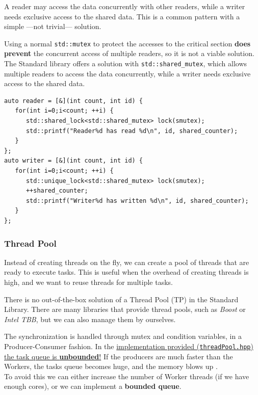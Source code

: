 A reader may access the data concurrently with
other readers, while a writer needs exclusive access to the shared data.
This is a common pattern with a simple  ---not trivial--- solution.

\begin{paracol}{2}
   
   \colfill
   Using a normal \lstinline|std::mutex| to protect the accesses to the critical section \textbf{does prevent} the concurrent access of multiple readers, so it is not a viable solution.
   The Standard library offers a solution with \lstinline|std::shared_mutex|, which allows multiple readers to access the data concurrently, while a writer needs exclusive access to the shared data.
   \colfill
   
   \switchcolumn   
   
   \begin{lstlisting}[caption={spm3/reader-writer.cpp}]
auto reader = [&](int count, int id) {
   for(int i=0;i<count; ++i) {
      std::shared_lock<std::shared_mutex> lock(smutex);
      std::printf("Reader%d has read %d\n", id, shared_counter);
   }
};
auto writer = [&](int count, int id) {
   for(int i=0;i<count; ++i) {
      std::unique_lock<std::shared_mutex> lock(smutex);
      ++shared_counter;
      std::printf("Writer%d has written %d\n", id, shared_counter);
   }
};  
\end{lstlisting}
               
\end{paracol}

\subsubsection{Thread Pool}
Instead of creating threads on the fly, we can create a pool of threads that are ready to execute tasks. This is useful when the overhead of creating threads is high, and we want to reuse threads for multiple tasks.

There is no out-of-the-box solution of a Thread Pool (TP) in the Standard Library. There are many libraries that provide thread pools, such as \textit{Boost} or \textit{Intel TBB}, but we can also manage them by ourselves.

The synchronization is handled through mutex and condition variables, in a Producer-Consumer fashion.
In the \ul{implementation provided (\texttt{threadPool.hpp}) the task queue is \textbf{unbounded}!}
If the producers are much faster than the Workers, the tasks queue becomes huge, and the memory blows up \frownie.\\
To avoid this we can either increase the number of Worker threads (if we have enough cores), or we can implement a \textbf{bounded queue}.

